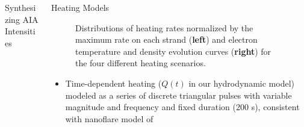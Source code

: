 \documentclass[final]{beamer}
\begin{document}
\begin{frame}
\begin{columns}[T]
\begin{column}{0.49\linewidth}
\begin{block}{Synthesizing AIA Intensities}
\begin{figure}
            \label{fig:synthesized_aia_maps}
            \centering
        \end{figure}
    \end{block}
  \end{column}
  \begin{column}{0.49\linewidth}
    \vspace{-1ex}
    \begin{block}{Heating Models}
        \vspace{-2ex}
        \begin{figure}
            \caption{Distributions of heating rates normalized by the maximum rate on each strand (\textbf{left}) and electron temperature and density evolution curves (\textbf{right}) for the four different heating scenarios.}
            \label{fig:wait_time_and_hydro}             
        \end{figure}
        \begin{itemize}
            \item Time-dependent heating ($Q(t)$ in our hydrodynamic model) modeled as a series of discrete triangular pulses with variable magnitude and frequency and fixed duration (200 s), consistent with nanoflare model of \citet{parker_nanoflares_1988}

\end{itemize}
\end{block}
\end{column}
\end{columns}
\end{frame}
\end{document}
